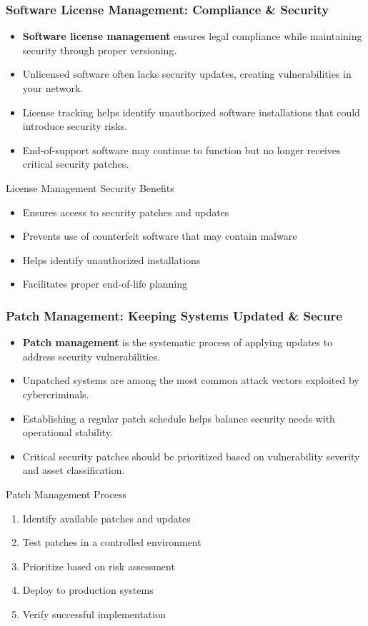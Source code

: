 \documentclass{beamer}
\begin{document}
\begin{frame}
\frametitle{Software License Management: Compliance \& Security}
\begin{itemize}
\item \textbf{Software license management} ensures legal compliance while maintaining security through proper versioning.
\item Unlicensed software often lacks security updates, creating vulnerabilities in your network.
\item License tracking helps identify unauthorized software installations that could introduce security risks.
\item End-of-support software may continue to function but no longer receives critical security patches.
\end{itemize}

\begin{block}{License Management Security Benefits}
\begin{itemize}
\item Ensures access to security patches and updates
\item Prevents use of counterfeit software that may contain malware
\item Helps identify unauthorized installations
\item Facilitates proper end-of-life planning
\end{itemize}
\end{block}
\end{frame}

\begin{frame}
\frametitle{Patch Management: Keeping Systems Updated \& Secure}
\begin{itemize}
\item \textbf{Patch management} is the systematic process of applying updates to address security vulnerabilities.
\item Unpatched systems are among the most common attack vectors exploited by cybercriminals.
\item Establishing a regular patch schedule helps balance security needs with operational stability.
\item Critical security patches should be prioritized based on vulnerability severity and asset classification.
\end{itemize}

\begin{alertblock}{Patch Management Process}
\begin{enumerate}
\item Identify available patches and updates
\item Test patches in a controlled environment
\item Prioritize based on risk assessment
\item Deploy to production systems
\item Verify successful implementation
\end{enumerate}
\end{alertblock}
\end{frame}
\end{document}
